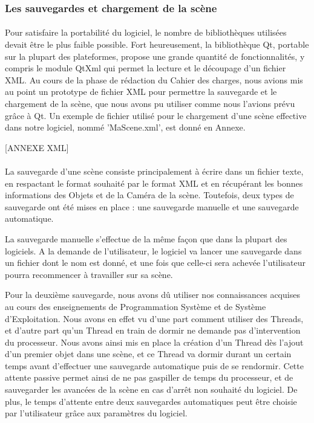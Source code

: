 \subsubsection{Les sauvegardes et chargement de la scène}
\paragraph{}
Pour satisfaire la portabilité du logiciel, le nombre de bibliothèques utilisées devait être le plus faible possible. Fort heureusement, la bibliothèque Qt, portable sur la plupart des plateformes, propose une grande quantité de fonctionnalités, y compris le module QtXml qui permet la lecture et le découpage d'un fichier XML. Au cours de la phase de rédaction du Cahier des charges, nous avions mis au point un prototype de fichier XML pour permettre la sauvegarde et le chargement de la scène, que nous avons pu utiliser comme nous l'avions prévu grâce à Qt. Un exemple de fichier utilisé pour le chargement d'une scène effective dans notre logiciel, nommé 'MaScene.xml', est donné en Annexe.

[ANNEXE XML]

\paragraph{}
La sauvegarde d'une scène consiste principalement à écrire dans un fichier texte, en respactant le format souhaité par le format XML et en récupérant les bonnes informations des Objets et de la Caméra de la scène. Toutefois, deux types de sauvegarde ont été mises en place : une sauvegarde manuelle et une sauvegarde automatique.

La sauvegarde manuelle s'effectue de la même façon que dans la plupart des logiciels. A la demande de l'utilisateur, le logiciel va lancer une sauvegarde dans un fichier dont le nom est donné, et une fois que celle-ci sera achevée l'utilisateur pourra recommencer à travailler sur sa scène.

Pour la deuxième sauvegarde, nous avons dû utiliser nos connaissances acquises au cours des enseignements de Programmation Système et de Système d'Exploitation. Nous avons en effet vu d'une part comment utiliser des Threads, et d'autre part qu'un Thread en train de dormir ne demande pas d'intervention du processeur. Nous avons ainsi mis en place la création d'un Thread dès l'ajout d'un premier objet dans une scène, et ce Thread va dormir durant un certain temps avant d'effectuer une sauvegarde automatique puis de se rendormir. Cette attente passive permet ainsi de ne pas gaspiller de temps du processeur, et de sauvegarder les avancées de la scène en cas d'arrêt non souhaité du logiciel. De plus, le temps d'attente entre deux sauvegardes automatiques peut être choisie par l'utilisateur grâce aux paramètres du logiciel.

